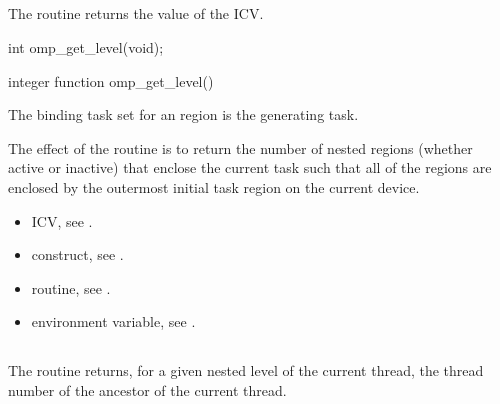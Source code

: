 \subsection{}
\label{subsec:omp_get_level}
\summary
The  routine returns the value of the  ICV.

\format
\begin{ccppspecific}
\begin{ompcFunction}
int omp_get_level(void);
\end{ompcFunction}
\end{ccppspecific}

\begin{fortranspecific}
\begin{ompfFunction}
integer function omp_get_level()
\end{ompfFunction}
\end{fortranspecific}

\binding
The binding task set for an  region is the generating task.

\effect
The effect of the  routine is to return the 
number of nested  regions (whether active or inactive) 
that enclose the current task such that all of the  
regions are enclosed by the outermost initial task region on the current device.

\crossreferences
\begin{itemize}
\item {} ICV, see
.

\item {} construct, see
.

\item {} routine, see
.

\item {} environment variable, see
.
\end{itemize}



\subsection{}
\label{subsec:omp_get_ancestor_thread_num}
\summary
The  routine returns, for a given nested level 
of the current thread, the thread number of the ancestor of the current thread.

